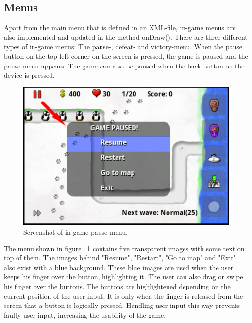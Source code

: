 \subsection{Menus}

Apart from the main menu that is defined in an XML-file, in-game menus are also implemented and updated in the method onDraw(). There are three different types of in-game menus: The pause-, defeat- and victory-menu. When the pause button on the top left corner on the screen is pressed, the game is paused and the pause menu appears. The game can also be paused when the back button on the device is pressed.

\begin{figure}[h]
\begin{center}
\includegraphics[scale=0.6]{pics/chapters/chapter4/in-gamePauseMenu}
\end{center}
\caption{Screenshot of in-game pause menu.}
\label{fig:ingamePauseMenu}
\end{figure}

The menu shown in figure ~\ref{fig:ingamePauseMenu} contains five transparent images with some text on top of them. The images behind "Resume", "Restart", "Go to map" and "Exit" also exist with a blue background. These blue images are used when the user keeps his finger over the button, highlighting it. The user can also drag or swipe his finger over the buttons. The buttons are highlightened depending on the current position of the user input.  It is only when the finger is released from the screen that a button is logically pressed. Handling user input this way prevents faulty user input, increasing the usability of the game.

